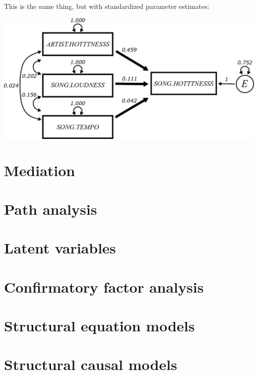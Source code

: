 \documentclass[
]{book}
\begin{document}
This is the same thing, but with standardized parameter estimates:

\begin{center}\includegraphics{graphics/multiple_regression_music_std} \end{center}

\hypertarget{mediation}{%
\chapter{Mediation}\label{mediation}}

\hypertarget{path}{%
\chapter{Path analysis}\label{path}}

\hypertarget{latent}{%
\chapter{Latent variables}\label{latent}}

\hypertarget{cfa}{%
\chapter{Confirmatory factor analysis}\label{cfa}}

\hypertarget{sem}{%
\chapter{Structural equation models}\label{sem}}

\hypertarget{scm}{%
\chapter{Structural causal models}\label{scm}}

\hypertarget{appendix-appendix}{%
\appendix}
\end{document}
